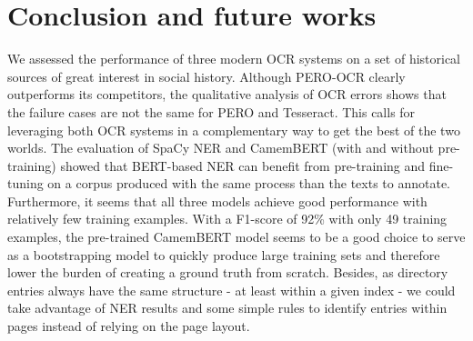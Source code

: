 \section{Conclusion and future works}
We assessed the performance of three modern OCR systems on a set of historical sources of great interest in social history.
Although PERO-OCR clearly outperforms its competitors, the qualitative analysis of OCR errors shows that the failure cases are not the same for PERO and Tesseract.
This calls for leveraging both OCR systems in a complementary way to get the best of the two worlds.
The evaluation of SpaCy NER and CamemBERT (with and without pre-training) showed that BERT-based NER can benefit from pre-training and fine-tuning on a corpus produced with the same process than the texts to annotate.
Furthermore, it seems that all three models achieve good performance with relatively few training examples.
With a F1-score of 92\% with only 49 training examples, the pre-trained CamemBERT model seems to be a good choice to serve as a bootstrapping model to quickly produce large training sets and therefore lower the burden of creating a ground truth from scratch.
Besides, as directory entries always have the same structure - at least within a given index - we could take advantage of NER results and some simple rules to identify entries within pages instead of relying on the page layout.
